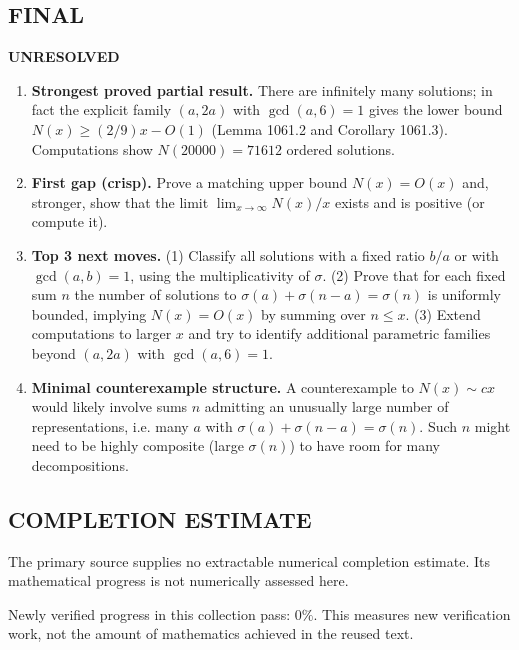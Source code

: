 \subsection*{FINAL}
\textbf{UNRESOLVED}
\begin{enumerate}
\item[(i)] \textbf{Strongest proved partial result.}
There are infinitely many solutions; in fact the explicit family $(a,2a)$ with $\gcd(a,6)=1$ gives the lower bound $N(x)\ge (2/9)x-O(1)$ (Lemma 1061.2 and Corollary 1061.3). Computations show $N(20000)=71612$ ordered solutions.
\item[(ii)] \textbf{First gap (crisp).}
Prove a matching upper bound $N(x)=O(x)$ and, stronger, show that the limit $\lim_{x\to\infty} N(x)/x$ exists and is positive (or compute it).
\item[(iii)] \textbf{Top 3 next moves.}
(1) Classify all solutions with a fixed ratio $b/a$ or with $\gcd(a,b)=1$, using the multiplicativity of $\sigma$.
(2) Prove that for each fixed sum $n$ the number of solutions to $\sigma(a)+\sigma(n-a)=\sigma(n)$ is uniformly bounded, implying $N(x)=O(x)$ by summing over $n\le x$.
(3) Extend computations to larger $x$ and try to identify additional parametric families beyond $(a,2a)$ with $\gcd(a,6)=1$.
\item[(iv)] \textbf{Minimal counterexample structure.}
A counterexample to $N(x)\sim cx$ would likely involve sums $n$ admitting an unusually large number of representations, i.e. many $a$ with $\sigma(a)+\sigma(n-a)=\sigma(n)$. Such $n$ might need to be highly composite (large $\sigma(n)$) to have room for many decompositions.
\end{enumerate}




\subsection*{COMPLETION ESTIMATE}
The primary source supplies no extractable numerical completion estimate. Its mathematical progress is not numerically assessed here.

Newly verified progress in this collection pass: $0\%$. This measures new verification work, not the amount of mathematics achieved in the reused text.
